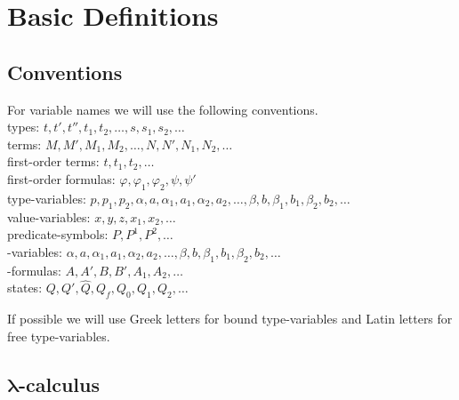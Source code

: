 \section{Basic Definitions}\label{sec.2}
\subsection{Conventions}
For variable names we will use the following conventions.\\
\lambdaTwo{} types: $t, t', t'', t_1, t_2, \dots,s,s_1,s_2,\dots$\\
\lambdaTwo{} terms: $M, M', M_1, M_2,\dots, N, N', N_1, N_2, \dots$\\
first-order terms: $t,t_1, t_2,\dots$\\
first-order formulas: $\varphi,\varphi_1,\varphi_2,\psi,\psi'$\\
type-variables: $p,p_1,p_2,\alpha, a,\alpha_1, a_1,\alpha_2,a_2, \dots, \beta, b,\beta_1,b_1,\beta_2,b_2, \dots$\\
value-variables: $x,y,z, x_1 , x_2 ,\dots$\\
predicate-symbols: $P,P^1,P^2,\dots$\\
\SysP-variables: $\alpha, a,\alpha_1, a_1,\alpha_2,a_2, \dots, \beta, b,\beta_1,b_1,\beta_2,b_2, \dots$\\
\SysP-formulas: $A,A' ,B,B',A_1,A_2,\dots$\\
states: $Q,Q',\widehat{Q},Q_f,Q_0,Q_1,Q_2,\dots$

If possible we will use Greek letters for bound type-variables and Latin letters for free type-variables.
\subsection{$\boldsymbol{\lambda}$-calculus \lambdaTwo{}}


